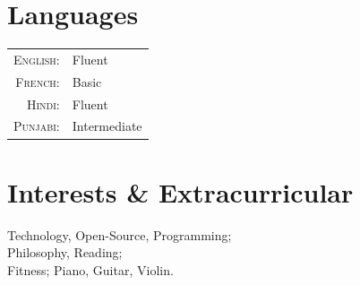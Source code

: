 \documentclass[a4paper,10pt]{article}
\begin{document}
\section{Languages}
\begin{tabular}{rl}
\textsc{English:}&Fluent\\
\textsc{French:}&Basic\\
\textsc{Hindi:}&Fluent\\
\textsc{Punjabi:}&Intermediate\\
\end{tabular}



\section{Interests \& Extracurricular}
Technology, Open-Source, Programming;\\ 
Philosophy, Reading; \\
Fitness; Piano, Guitar, Violin.

\end{document}

